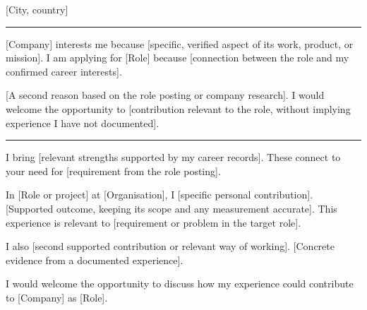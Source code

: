 \documentclass[a4paper,10pt]{article}
\newlength{\cvcolumngapwidth}
\newlength{\cvleftcolumnwidth}
\newlength{\cvrightcolumnwidth}
\newcommand{\cvnamestyle}[1]{{\Large\cvnamefont\textcolor{cvnamecolor}{#1}}}
\newcommand{\cvsectionstyle}[1]{{\normalsize\cvsectionfont\textcolor{cvsectioncolor}{#1}}}
\newlength{\cvafterheaderskipamount}
\newlength{\cvaftersectionskipamount}
\newcommand{\cvheader}[2]{
    \begin{minipage}[t]{\cvleftcolumnwidth}
        \raggedleft\cvnamestyle{#1}
    \end{minipage}%
    \hspace{\cvcolumngapwidth}%
    \begin{minipage}[t]{\cvrightcolumnwidth}
        #2
    \end{minipage}
    \par\vspace{\cvafterheaderskipamount}
}
\newcommand{\cvsection}[1]{
    \begin{minipage}[t]{\cvleftcolumnwidth}
        \raggedleft\cvsectionstyle{#1}
    \end{minipage}%
    \hspace{\cvcolumngapwidth}%
    \begin{minipage}[t]{\cvrightcolumnwidth}
        \textcolor{cvrulecolor}{\rule{\cvrightcolumnwidth}{0.3mm}}
    \end{minipage}
    \par\vspace{\cvaftersectionskipamount}
}
\newcommand{\cvlettertext}[1]{
    \begin{minipage}[t]{\cvleftcolumnwidth}
        \mbox{}
    \end{minipage}%
    \hspace{\cvcolumngapwidth}%
    \begin{minipage}[t]{\cvrightcolumnwidth}
        \setlength{\parindent}{0mm}
        \setlength{\parskip}{2.5mm plus 0.5mm minus 0.5mm}
        #1
    \end{minipage}
    \par\vspace{4mm}
}
\begin{document}
\cvheader{[Full name]}{
    [City, country]\par
    [Optional phone]\par
    [Email]\par
    [Professional link]
}

\cvsection{WHY THIS COMPANY?}

\cvlettertext{
[Company] interests me because [specific, verified aspect of its work, product, or mission]. I am applying for [Role] because [connection between the role and my confirmed career interests].

[A second reason based on the role posting or company research]. I would welcome the opportunity to [contribution relevant to the role, without implying experience I have not documented].
}

\cvsection{WHY ME?}

\cvlettertext{
I bring [relevant strengths supported by my career records]. These connect to your need for [requirement from the role posting].

In [Role or project] at [Organisation], I [specific personal contribution]. [Supported outcome, keeping its scope and any measurement accurate]. This experience is relevant to [requirement or problem in the target role].

I also [second supported contribution or relevant way of working]. [Concrete evidence from a documented experience].

I would welcome the opportunity to discuss how my experience could contribute to [Company] as [Role].
}
\end{document}
